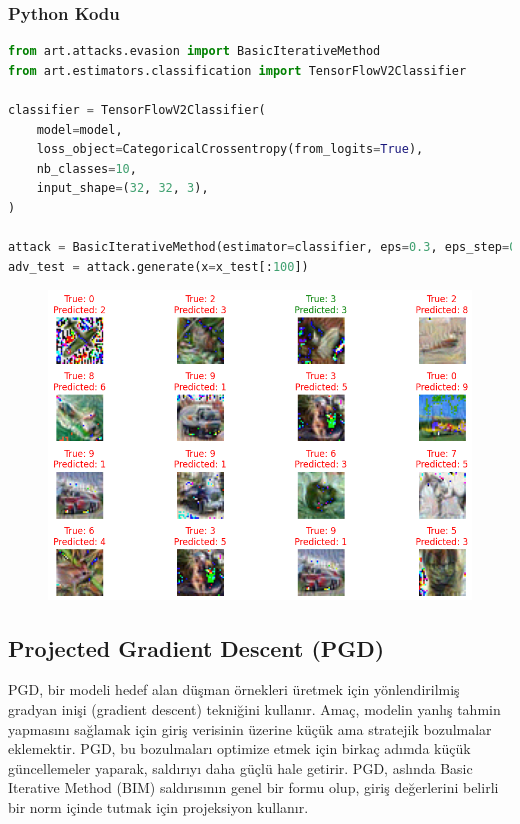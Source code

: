 \subsubsection{Python Kodu}

\begin{lstlisting}[language=Python]
from art.attacks.evasion import BasicIterativeMethod
from art.estimators.classification import TensorFlowV2Classifier

classifier = TensorFlowV2Classifier(
    model=model,
    loss_object=CategoricalCrossentropy(from_logits=True),
    nb_classes=10,
    input_shape=(32, 32, 3),
)

attack = BasicIterativeMethod(estimator=classifier, eps=0.3, eps_step=0.01, max_iter=10)
adv_test = attack.generate(x=x_test[:100])
\end{lstlisting}

\newpage

\begin{figure}[h]
    \centering
    \includegraphics[width=1\textwidth]{images/basic_iterative_method_results.png}
    \caption{}
\end{figure}

\newpage

\subsection{Projected Gradient Descent (PGD)}

PGD, bir modeli hedef alan düşman örnekleri üretmek için yönlendirilmiş gradyan inişi (gradient descent) tekniğini kullanır. Amaç, modelin yanlış tahmin yapmasını sağlamak için giriş verisinin üzerine küçük ama stratejik bozulmalar eklemektir. PGD, bu bozulmaları optimize etmek için birkaç adımda küçük güncellemeler yaparak, saldırıyı daha güçlü hale getirir. PGD, aslında Basic Iterative Method (BIM) saldırısının genel bir formu olup, giriş değerlerini belirli bir norm içinde tutmak için projeksiyon kullanır.

